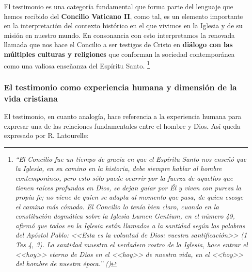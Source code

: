 \documentclass[12pt]{article}
\begin{document}
El testimonio es una categoría fundamental que forma parte del lenguaje que hemos recibido del \textbf{Concilio Vaticano II}, como tal, es un elemento importante en la interpretación del contexto histórico en el que vivimos en la Iglesia y de su misión en nuestro mundo. En consonancia con esto interpretamos la renovada llamada que nos hace el Concilio a ser testigos de Cristo en \textbf{diálogo con las múltiples culturas y religiones} que conforman la sociedad contemporánea como una valiosa enseñanza del Espíritu Santo.
\footnote{ 
\emph{ ``El Concilio fue un tiempo de gracia en que el Espíritu Santo nos enseñó que la Iglesia, en su camino en la historia, debe siempre hablar al hombre contemporáneo, pero esto sólo puede ocurrir por la fuerza de aquellos que tienen raíces profundas en Dios, se dejan guiar por Él y viven con pureza la propia fe; no viene de quien se adapta al momento que pasa, de quien escoge el camino más cómodo. El Concilio lo tenía bien claro, cuando en la constitución dogmática sobre la Iglesia Lumen Gentium, en el número 49, afirmó que todos en la Iglesia están llamados a la santidad según las palabras del Apóstol Pablo: <<Esta es la voluntad de Dios: vuestra santificación>> (1 Tes 4, 3). La santidad muestra el verdadero rostro de la Iglesia, hace entrar el <<hoy>> eterno de Dios en el <<hoy>> de nuestra vida, en el <<hoy>> del hombre de nuestra época.'' (\cite{benxvi})
}
}

\subsubsection{El testimonio como experiencia humana y dimensión de la vida cristiana}

El testimonio, en cuanto analogía, hace referencia a la experiencia humana para expresar una de las relaciones fundamentales entre el hombre y Dios. Así queda expresado por R. Latourelle:
\end{document}
